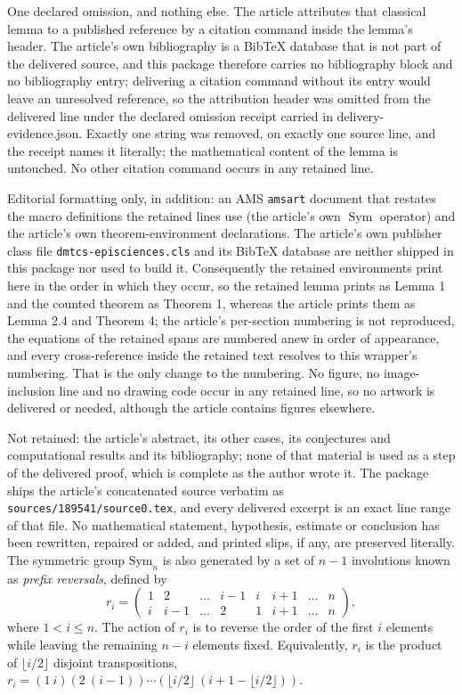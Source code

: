 \documentclass[10pt,a4paper]{amsart}
\theoremstyle{plain}
\theoremstyle{definition}
\DeclareMathOperator{\Sym}{\mathrm{Sym}}
\begin{document}
One declared omission, and nothing else. The article attributes that classical lemma to a published reference by a citation command inside the lemma's header. The article's own bibliography is a BibTeX database that is not part of the delivered source, and this package therefore carries no bibliography block and no bibliography entry; delivering a citation command without its entry would leave an unresolved reference, so the attribution header was omitted from the delivered line under the declared omission receipt carried in delivery-evidence.json. Exactly one string was removed, on exactly one source line, and the receipt names it literally; the mathematical content of the lemma is untouched. No other citation command occurs in any retained line.

Editorial formatting only, in addition: an AMS \texttt{amsart} document that restates the macro definitions the retained lines use (the article's own $\Sym$ operator) and the article's own theorem-environment declarations. The article's own publisher class file \texttt{dmtcs-episciences.cls} and its BibTeX database are neither shipped in this package nor used to build it. Consequently the retained environments print here in the order in which they occur, so the retained lemma prints as Lemma 1 and the counted theorem as Theorem 1, whereas the article prints them as Lemma 2.4 and Theorem 4; the article's per-section numbering is not reproduced, the equations of the retained spans are numbered anew in order of appearance, and every cross-reference inside the retained text resolves to this wrapper's numbering. That is the only change to the numbering. No figure, no image-inclusion line and no drawing code occur in any retained line, so no artwork is delivered or needed, although the article contains figures elsewhere.

Not retained: the article's abstract, its other cases, its conjectures and computational results and its bibliography; none of that material is used as a step of the delivered proof, which is complete as the author wrote it. The package ships the article's concatenated source verbatim as \texttt{sources/189541/source0.tex}, and every delivered excerpt is an exact line range of that file. No mathematical statement, hypothesis, estimate or conclusion has been rewritten, repaired or added, and printed slips, if any, are preserved literally.
The symmetric group $\mathrm{Sym}_n$ is also generated by a set of $n-1$ involutions known as \emph{prefix reversals}, defined by
\begin{equation} \label{e1}
r_i=\begin{pmatrix} 
1 & 2 & \ldots & i-1 & i & i+1 & \ldots & n \\ 
i & i-1 & \ldots & 2 & 1 & i+1 & \ldots & n
\end{pmatrix},
\end{equation}
where $1<i\leqslant n$. The action of $r_i$ is to reverse the order of the first $i$ elements while leaving the remaining $n-i$ elements fixed. Equivalently, $r_i$ is the product of $\lfloor i/2 \rfloor$ disjoint transpositions, $r_i=(1\ i)(2\ (i-1))\cdots(\lfloor i/2\rfloor\ (i+1-\lfloor i/2\rfloor))$.
\end{document}

